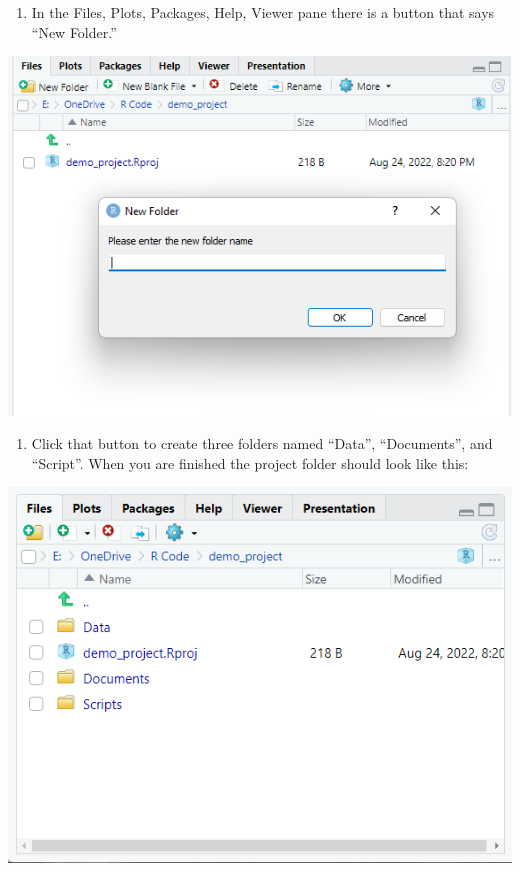 \documentclass[
]{book}
\providecommand{\tightlist}{%
  \setlength{\itemsep}{0pt}\setlength{\parskip}{0pt}}
\begin{document}
\begin{enumerate}
\def\labelenumi{\arabic{enumi}.}
\setcounter{enumi}{1}
\tightlist
\item
  In the Files, Plots, Packages, Help, Viewer pane there is a button that says ``New Folder.''
\end{enumerate}

\includegraphics[width=7.85in]{images/newfolder}

\begin{enumerate}
\def\labelenumi{\arabic{enumi}.}
\setcounter{enumi}{2}
\tightlist
\item
  Click that button to create three folders named ``Data'', ``Documents'', and ``Script''. When you are finished the project folder should look like this:
\end{enumerate}

\includegraphics[width=7.93in]{images/tiermain}
\end{document}
